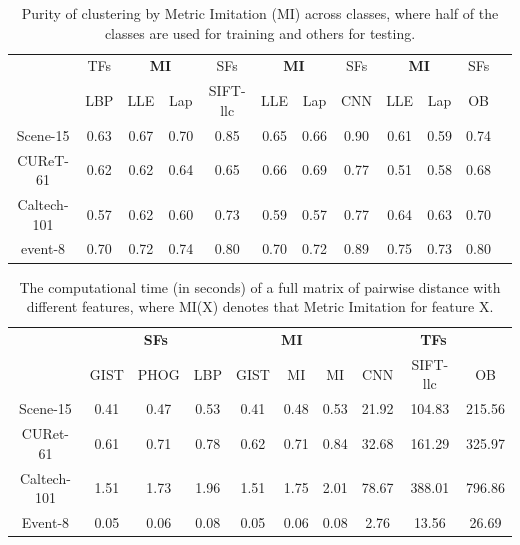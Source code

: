 \begin{table}[!tb]
  \centering \small  \setlength{\tabcolsep}{.60em} 
  \caption{Purity of clustering by Metric Imitation (MI) across classes, where half of the classes are used for training and others for testing.}
  \begin{tabular}{c|c|ccc|ccc|cccc}
   & TFs & \multicolumn{2}{c}{\textbf{MI}} & SFs & \multicolumn{2}{c}{ \textbf{MI} } & SFs & \multicolumn{2}{c}{ \textbf{MI}} & SFs  \\   
    & LBP & LLE & Lap & SIFT-llc  & LLE & Lap & CNN &  LLE & Lap & OB     \\   \hline
     Scene-15    & 0.63  & 0.67  & 0.70  & 0.85  & 0.65  & 0.66  & 0.90    & 0.61  & 0.59  & 0.74 \\ 
    CUReT-61 & 0.62  & 0.62  & 0.64  & 0.65   & 0.66  & 0.69  & 0.77   & 0.51  & 0.58  & 0.68 \\ 
    Caltech-101 & 0.57  & 0.62  & 0.60  & 0.73  & 0.59  & 0.57  & 0.77     & 0.64  &0.63 &  0.70   \\ 
    event-8& 0.70  & 0.72  & 0.74  & 0.80   & 0.70  & 0.72  & 0.89    & 0.75  & 0.73  & 0.80\\    \end{tabular}
  \label{tab:clustering:across}
\end{table}


\begin{table}[!tb]
  \centering \small  \setlength{\tabcolsep}{.60em} 
  \caption{The computational time (in seconds) of a full matrix of pairwise distance with different 
    features, where MI(X) denotes that Metric Imitation for feature X.   }
  \begin{tabular}{c|ccc|ccc|ccc}  
 &  \multicolumn{3}{c}{\textbf{SFs}}   & \multicolumn{3}{c}{\textbf{MI}} & \multicolumn{3}{c}{\textbf{TFs}}  \\ 
   & GIST   & PHOG &LBP &  GIST & MI  &  MI &   CNN & SIFT-llc & OB \\ \hline
 Scene-15 & 0.41    & 0.47 & 0.53  & 0.41     & 0.48 & 0.53 & 21.92 & 104.83  & 215.56   \\
 CURet-61  & 0.61  & 0.71 & 0.78    & 0.62    & 0.71 & 0.84 & 32.68 & 161.29  & 325.97   \\ 
 Caltech-101 & 1.51  & 1.73 & 1.96  & 1.51    & 1.75 & 2.01  & 78.67  & 388.01  & 796.86 \\ 
 Event-8  & 0.05    & 0.06 & 0.08  & 0.05   & 0.06 & 0.08    & 2.76 & 13.56  & 26.69  \\ 
  \end{tabular}
  \label{tab:time}
\end{table}


